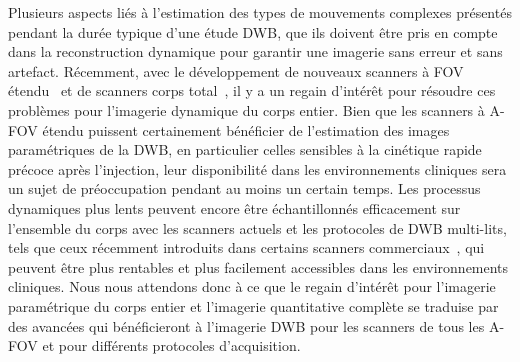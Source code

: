 \documentclass[a4paper]{article}
\begin{document}
Plusieurs aspects liés à l'estimation des types de mouvements complexes présentés pendant la durée typique d'une étude DWB, que ils doivent être pris en compte dans la reconstruction dynamique pour garantir une imagerie sans erreur et sans artefact.
Récemment, avec le développement de nouveaux scanners à FOV étendu~\cite{Karp2020,Siegel2020} et de scanners corps total~\cite{Cherry2018}, il y a un regain d'intérêt pour résoudre ces problèmes pour l'imagerie dynamique du corps entier. 
Bien que les scanners à A-FOV étendu puissent certainement bénéficier de l'estimation des images paramétriques de la DWB, en particulier celles sensibles à la cinétique rapide précoce après l'injection, leur disponibilité dans les environnements cliniques sera un sujet de préoccupation pendant au moins un certain temps. Les processus dynamiques plus lents peuvent encore être échantillonnés efficacement sur l'ensemble du corps avec les scanners actuels et les protocoles de DWB multi-lits, tels que ceux récemment introduits dans certains scanners commerciaux~\cite{Hu2020}, qui peuvent être plus rentables et plus facilement accessibles dans les environnements cliniques.
Nous nous attendons donc à ce que le regain d'intérêt pour l'imagerie paramétrique du corps entier et l'imagerie quantitative complète se traduise par des avancées qui bénéficieront à l'imagerie DWB pour les scanners de tous les A-FOV et pour différents protocoles d'acquisition. 


\end{document}
